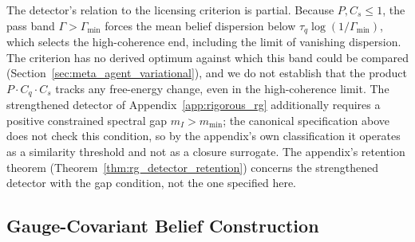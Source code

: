 The detector's relation to the licensing criterion is partial. Because $P, C_s \le 1$, the pass band $\Gamma > \Gamma_{\min}$ forces the mean belief dispersion below $\tau_q\log(1/\Gamma_{\min})$, which selects the high-coherence end, including the limit of vanishing dispersion. The criterion has no derived optimum against which this band could be compared (Section~\ref{sec:meta_agent_variational}), and we do not establish that the product $P \cdot C_q \cdot C_s$ tracks any free-energy change, even in the high-coherence limit. The strengthened detector of Appendix~\ref{app:rigorous_rg} additionally requires a positive constrained spectral gap $m_I > m_{\min}$; the canonical specification above does not check this condition, so by the appendix's own classification it operates as a similarity threshold and not as a closure surrogate. The appendix's retention theorem (Theorem~\ref{thm:rg_detector_retention}) concerns the strengthened detector with the gap condition, not the one specified here.

\subsection{Gauge-Covariant Belief Construction}
\label{sec:meta_agent_state_construction}

